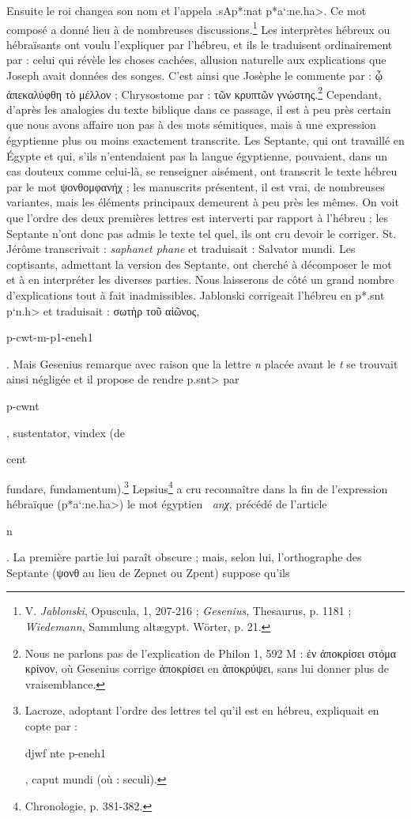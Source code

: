 \documentclass[a4paper, 11pt, oneside]{article}
\newcommand*\hieroAADL{}
\newcommand*\hieroAARZ{}
\newcommand*\hieroAATN{}
\begin{document}
Ensuite le roi changea son nom et l'appela \foreignlanguage{hebrew}{\<.sAp*:nat p*a`:ne.ha>}. Ce mot composé a donné lieu à de nombreuses discussions.\footnote{V. \emph{Jablonski}, Opuscula, 1, 207-216 ; \emph{Gesenius}, Thesaurus, p. 1181 ; \emph{Wiedemann}, Sammlung altægypt. Wörter, p. 21.} Les interprètes hébreux ou hébraïsants ont voulu l'expliquer par l'hébreu, et ils le traduisent ordinairement par : celui qui révèle les choses cachées, allusion naturelle aux explications que Joseph avait données des songes. C'est ainsi que Josèphe le commente par : ᾧ ἀπεκαλύφθη τὸ μέλλον ; Chrysostome par : τῶν κρυπτῶν γνώστης.\footnote{Nous ne parlons pas de l'explication de Philon 1, 592 M : ἐν ἀποκρίσει στόμα κρίνον, où Gesenius corrige ἀποκρίσει en ἀποκρύψει, sans lui donner plus de vraisemblance.} Cependant, d'après les analogies du texte biblique dans ce passage, il est à peu près certain que nous avons affaire non pas à des mots sémitiques, mais à une expression égyptienne plus ou moins exactement transcrite. Les Septante, qui ont travaillé en Égypte et qui, s'ils n'entendaient pas la langue égyptienne, pouvaient, dans un cas douteux comme celui-là, se renseigner aisément, ont transcrit le texte hébreu par le mot ψονθομφανήχ ; les manuscrits présentent, il est vrai, de nombreuses variantes, mais les éléments principaux demeurent à peu près les mêmes. On voit que l'ordre des deux premières lettres est interverti par rapport à l'hébreu ; les Septante n'ont donc pas admis le texte tel quel, ils ont cru devoir le corriger. St. Jérôme transcrivait : \emph{saphanet phane} et traduisait : Salvator mundi. Les coptisants, admettant la version des Septante, ont cherché à décomposer le mot et à en interpréter les diverses parties. Nous laisserons de côté un grand nombre d'explications tout à fait inadmissibles. Jablonski corrigeait l'hébreu en \foreignlanguage{hebrew}{\<p*.snt p`n.h>} et traduisait : σωτὴρ τοῦ αἰῶνος, \begin{coptic}p-cwt-m-p1-eneh1\end{coptic}. Mais Gesenius remarque avec raison que la lettre \emph{n} placée avant le \emph{t} se trouvait ainsi négligée et il propose de rendre \foreignlanguage{hebrew}{\<p.snt>} par \begin{coptic}p-cwnt\end{coptic}, sustentator, vindex (de \begin{coptic}cent\end{coptic} fundare, fundamentum).\footnote{Lacroze, adoptant l'ordre des lettres tel qu'il est en hébreu, expliquait en copte par : \begin{coptic}djwf nte p-eneh1\end{coptic}, caput mundi (où : seculi).} Lepsius\footnote{Chronologie, p. 381-382.} a cru reconnaître dans la fin de l'expression hébraïque (\foreignlanguage{hebrew}{\<p*a`:ne.ha>}) le mot égyptien $\hieroAARZ\:\hieroAATN$ \emph{anχ}, précédé de l'article $\hieroAADL$ \begin{coptic}n\end{coptic}. La première partie lui paraît obscure ; mais, selon lui, l'orthographe des Septante (ψονθ au lieu de Zepnet ou Zpent) suppose qu'ils 
\end{document}
